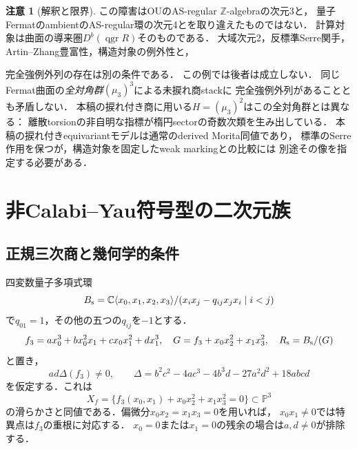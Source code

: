 \documentclass[11pt,a4paper]{ltjsarticle}
\theoremstyle{definition}
\newtheorem{remark}[theorem]{注意}
\newcommand{\qgr}{\operatorname{qgr}}
\begin{document}
\begin{remark}[解釈と限界]
この障害はOUのAS-regular $\mathbb Z$-algebraの次元3と，
量子FermatのambientのAS-regular環の次元4とを取り違えたものではない．
計算対象は曲面の導来圏$D^b(\qgr R)$そのものである．
大域次元2，反標準Serre関手，Artin--Zhang豊富性，構造対象の例外性と，

完全強例外列の存在は別の条件である．
この例では後者は成立しない．
同じFermat曲面の\emph{全対角群}$(\mu_3)^3$による未捩れ商stackに
完全強例外列があること\cite{IU}とも矛盾しない．
本稿の捩れ付き商に用いる$H=(\mu_3)^2$はこの全対角群とは異なる：
離散torsionの非自明な指標が楕円sectorの奇数次類を生み出している．
本稿の捩れ付きequivariantモデルは通常のderived Morita同値であり，
標準のSerre作用を保つが，構造対象を固定したweak markingとの比較には
別途その像を指定する必要がある．
\end{remark}


\section{非Calabi--Yau符号型の二次元族}\label{sec:sign-family}

\subsection{正規三次商と幾何学的条件}
四変数量子多項式環
\[
 B_{\rm s}=\mathbb C\langle x_0,x_1,x_2,x_3\rangle/
 (x_ix_j-q_{ij}x_jx_i\mid i<j)
\]
で$q_{01}=1$，その他の五つの$q_{ij}$を$-1$とする．
\[
 f_3=a x_0^3+b x_0^2x_1+c x_0x_1^2+d x_1^3,\quad
 G=f_3+x_0x_2^2+x_1x_3^2,\quad R_{\rm s}=B_{\rm s}/(G)
\]
と置き，
\begin{equation}\label{eq:sign-smooth}
 ad\Delta(f_3)\ne0,\qquad
 \Delta=b^2c^2-4ac^3-4b^3d-27a^2d^2+18abcd
\end{equation}
を仮定する．これは
\[
 X_f=\{f_3(x_0,x_1)+x_0x_2^2+x_1x_3^2=0\}\subset\mathbb P^3
\]
の滑らかさと同値である．偏微分$x_0x_2=x_1x_3=0$を用いれば，
$x_0x_1\ne0$では特異点は$f_3$の重根に対応する．
$x_0=0$または$x_1=0$の残余の場合は$a,d\ne0$が排除する．
\end{document}
